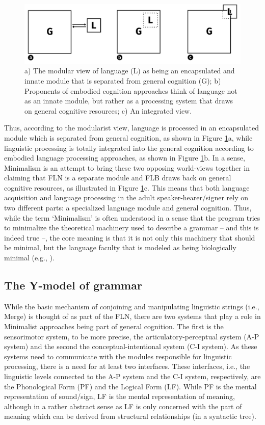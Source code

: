 \begin{figure}[bt]
\centering
	\includegraphics[width=1.0\textwidth]{model}
	\caption{a) The modular view of language (L) as being an encapsulated and innate module that is separated from general cognition (G); b) Proponents of embodied cognition approaches think of language not as an innate module, but rather as a processing system that draws on general cognitive resources; c) An integrated view.}
	\label{model}
\end{figure}

Thus, according to the modularist view, language is processed in an encapsulated module which is separated from general cognition, as shown in Figure \ref{model}a, while linguistic processing is totally integrated into the general cognition according to embodied language processing approaches, as shown in Figure \ref{model}b.  In a sense, Minimalism is an attempt to bring these two opposing world-views together in claiming that FLN is a separate module and FLB draws back on general cognitive resources, as illustrated in Figure \ref{model}c. This means that both language acquisition and language processing in the adult speaker-hearer/signer rely on two different parts: a specialized language module and general cognition. Thus, while the term `Minimalism' is often understood in a sense that the program tries to minimalize the theoretical machinery used to describe a grammar -- and this is indeed true --, the core meaning is that it is not only this machinery that should be minimal, but the language faculty that is modeled as being biologically minimal (e.g., \citealt{sigurdsson2011uniformity}).

\subsection{The Y-model of grammar}
While the basic mechanism of conjoining and manipulating linguistic strings (i.e., Merge) is thought of as part of the FLN, there are two systems that play a role in Minimalist approaches being part of general cognition. The first is the sensorimotor system, to be more precise, the articulatory-perceptual system (A-P system) and the second the conceptual-intentional system (C-I system). As these systems need to communicate with the modules responsible for linguistic processing, there is a need for at least two interfaces. These interfaces, i.e., the linguistic levels connected to the A-P system and the C-I system, respectively, are the Phonological Form (PF) and the Logical Form (LF). While PF is the mental representation of sound/sign, LF is the mental representation of meaning, although in a rather abstract sense as LF is only concerned with the part of meaning which can be derived from structural relationships (in a syntactic tree).
 
